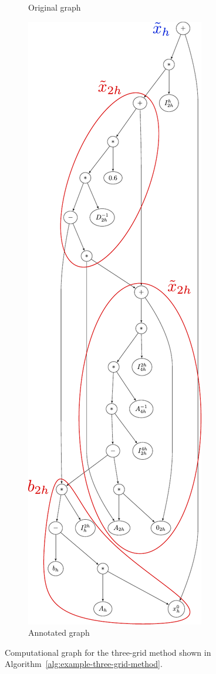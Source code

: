 \begin{figure}
\begin{subfigure}[b]{0.49\textwidth}
		\caption{Original graph}
		\label{fig:example-three-grid-method-computational-graph-original}
	\end{subfigure}
	\centering
	\begin{subfigure}[b]{0.49\textwidth}
		\includegraphics[scale=0.5]{figures/trees/three_grid_method_computational_graph_annotated.pdf}
		\caption{Annotated graph}
		\label{fig:example-three-grid-method-computational-graph-annotated}
	\end{subfigure}
	\caption{Computational graph for the three-grid method shown in Algorithm~\ref{alg:example-three-grid-method}.}
	\label{fig:example-three-grid-method-computational-graph}
\end{figure}
